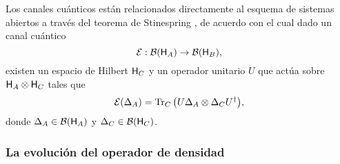 Los canales cuánticos están relacionados directamente al esquema de sistemas abiertos a través del teorema de Stinespring \cite{Watrous}, de acuerdo con el cual dado un canal cuántico
\begin{equation}
    \mathcal{E}:\mathcal{B}({\sf H}_{A})\rightarrow \mathcal{B}({\sf H}_{B}),\nonumber
\end{equation}    
existen un espacio de Hilbert ${\sf H}_{C}$ y un operador unitario $U$ que actúa sobre ${\sf H}_{A}\otimes {\sf H}_{C}$ tales que
\begin{equation}
    \mathcal{E}(\Delta_{A})=\Tr_{C}\qty(U \Delta_{A} \otimes \Delta_{C} U^{\dag}),\nonumber
\end{equation}
donde $\Delta_{A}\in\mathcal{B}({\sf H}_{A})$ y $\Delta_{C}\in\mathcal{B}({\sf H}_{C})$.
\iffalse
\subsubsection{La evolución del operador de densidad}

